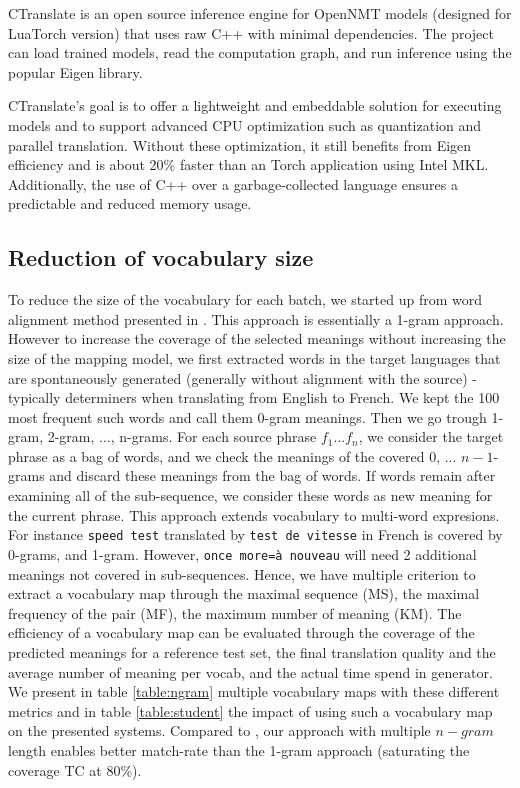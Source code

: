 \documentclass[11pt,a4paper]{article}
\begin{document}
CTranslate is an open source inference engine for OpenNMT models (designed for LuaTorch version) that uses raw C++ with minimal dependencies. The project can load trained models, read the computation graph, and run inference using the popular Eigen library.

CTranslate's goal is to offer a lightweight and embeddable solution for executing models and to support advanced CPU optimization such as quantization and parallel translation. Without these optimization, it still benefits from Eigen efficiency and is about 20\% faster than an Torch application using Intel MKL. Additionally, the use of C++ over a garbage-collected language ensures a predictable and reduced memory usage.


\subsection{Reduction of vocabulary size}
To reduce the size of the vocabulary for each batch, we started up from word alignment method presented in \cite{shi2017speeding}. This approach is essentially a 1-gram approach. However to increase the coverage of the selected meanings without increasing the size of the mapping model, we first extracted words in the target languages that are spontaneously generated (generally without alignment with the source) - typically determiners when translating from English to French. We kept the 100 most frequent such words and call them 0-gram meanings. Then we go trough 1-gram, 2-gram, ..., n-grams. For each source phrase $f_1 ... f_n$, we consider the target phrase as a bag of words, and we check the meanings of the covered $0$, ... $n-1$-grams and discard these meanings from the bag of words. If words remain after examining all of the sub-sequence, we consider these words as new meaning for the current phrase. This approach extends vocabulary to multi-word expresions. For instance {\tt speed test} translated by {\tt test de vitesse} in French is covered by 0-grams, and 1-gram. However, {\tt once more=à nouveau} will need 2 additional meanings not covered in sub-sequences. Hence, we have multiple criterion to extract a vocabulary map through the maximal sequence (MS), the maximal frequency of the pair (MF), the maximum number of meaning (KM). The efficiency of a vocabulary map can be evaluated through the coverage of the predicted meanings  for a reference test set, the final translation quality and the average number of meaning per vocab, and the actual time spend in generator.
We present in table \ref{table:ngram} multiple vocabulary maps with these different metrics and in table \ref{table:student} the impact of using such a vocabulary map on the presented systems. Compared to \cite{shi2017speeding}, our approach with multiple $n-gram$ length enables better match-rate than the 1-gram approach (saturating the coverage TC at 80\%).
\end{document}
